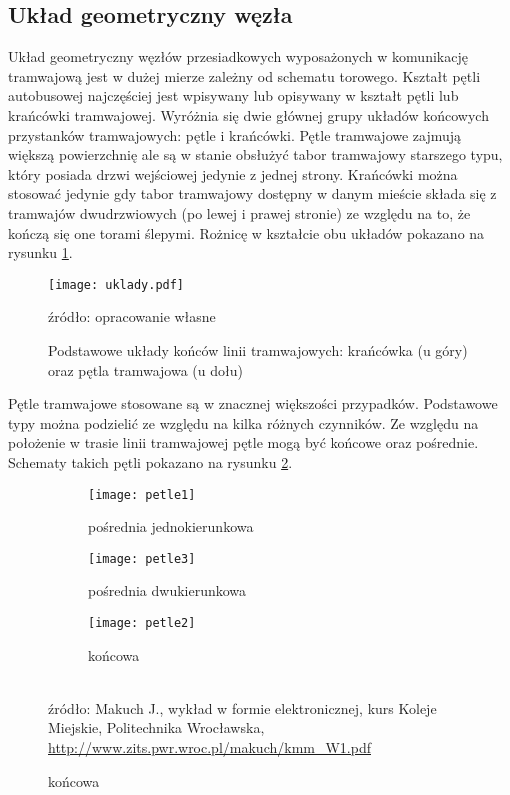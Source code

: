 \documentclass[twoside,12pt]{article}
\begin{document}
	\clearpage
	\subsection{Układ geometryczny węzła}
	
	Układ geometryczny węzłów przesiadkowych wyposażonych w komunikację tramwajową jest w dużej mierze zależny od schematu torowego. Kształt pętli autobusowej najczęściej jest wpisywany lub opisywany w kształt pętli lub krańcówki tramwajowej. Wyróżnia się dwie głównej grupy układów końcowych przystanków tramwajowych: pętle i krańcówki. Pętle tramwajowe zajmują większą powierzchnię ale są w stanie obsłużyć tabor tramwajowy starszego typu, który posiada drzwi wejściowej jedynie z jednej strony. Krańcówki można stosować jedynie gdy tabor tramwajowy dostępny w danym mieście składa się z tramwajów dwudrzwiowych (po lewej i prawej stronie) ze względu na to, że kończą się one torami ślepymi. Rożnicę w kształcie obu układów pokazano na rysunku \ref{uklady}.
	
	\begin{figure}[H]
		\centering
		\caption{Podstawowe układy końców linii tramwajowych: krańcówka (u góry) oraz pętla tramwajowa (u dołu)}
		\texttt{[image: uklady.pdf]}\\
		\label{uklady}
		
		\footnotesize{źródło: opracowanie własne}
	\end{figure}
	
	Pętle tramwajowe stosowane są w znacznej większości przypadków. Podstawowe typy można podzielić ze względu na kilka różnych czynników. Ze względu na położenie w trasie linii tramwajowej pętle mogą być końcowe oraz pośrednie. Schematy takich pętli pokazano na rysunku \ref{petle1}.
	
	\begin{figure}[H]
	\centering
	\caption{Podział pętli tramwajowych ze względu na położenia w trasie}
	\begin{subfigure}{.33\textwidth}
	  \centering
	  \caption{pośrednia jednokierunkowa}
	  \texttt{[image: petle1]}
	\end{subfigure}%
	\begin{subfigure}{.33\textwidth}
	  \centering
	  \caption{pośrednia dwukierunkowa}
	  \texttt{[image: petle3]}
	\end{subfigure}%
	\begin{subfigure}{.33\textwidth}
	  \centering
	  \caption{końcowa}
	  \texttt{[image: petle2]}
	\end{subfigure}
	\label{petle1}\\
	\footnotesize{źródło: Makuch J., wykład w formie elektronicznej, kurs Koleje Miejskie, Politechnika Wrocławska, \url{http://www.zits.pwr.wroc.pl/makuch/kmm_W1.pdf} \cite{makuch}}
	\end{figure}
\end{document}

